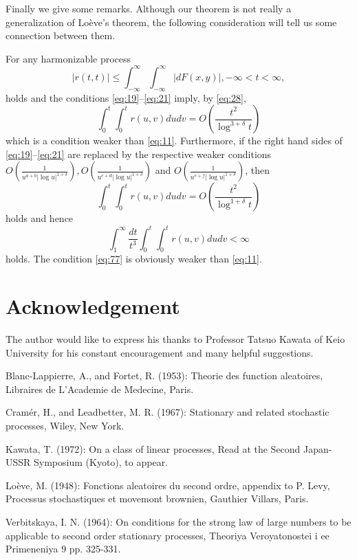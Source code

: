 \documentclass{article}
\begin{document}
Finally we give some remarks. Although our theorem is not really a generalization of Loève's theorem, the following consideration will tell us some connection between them.

For any harmonizable process
\begin{equation}\label{eq:74}
|r(t,t)| \leq \int_{-\infty}^{\infty} \int_{-\infty}^{\infty}|dF(x,y)|, -\infty<t<\infty,
\end{equation}
holds and the conditions \eqref{eq:19}--\eqref{eq:21} imply, by \eqref{eq:28},
\begin{equation}\label{eq:75}
\int_{0}^{t} \int_{0}^{t} r(u,v) dudv=O\left(\frac{t^{2}}{\log^{3+\delta} t}\right)
\end{equation}
which is a condition weaker than \eqref{eq:11}. Furthermore, if the right hand sides of \eqref{eq:19}--\eqref{eq:21} are replaced by the respective weaker conditions $O\left(\frac{1}{u^{a+b}|\log u|^{1+\delta}}\right), O\left(\frac{1}{u^{c+d}|\log u|^{1+\delta}}\right)$ and $O\left(\frac{1}{u^{e+f}|\log u|^{1+\delta}}\right)$, then
\begin{equation}\label{eq:76}
\int_{0}^{t} \int_{0}^{t} r(u,v) dudv=O\left(\frac{t^{2}}{\log^{1+\delta} t}\right)
\end{equation}
holds and hence
\begin{equation}\label{eq:77}
\int_{1}^{\infty} \frac{dt}{t^{3}} \int_{0}^{t} \int_{0}^{t} r(u,v) dudv<\infty
\end{equation}
holds. The condition \eqref{eq:77} is obviously weaker than \eqref{eq:11}.

\section*{Acknowledgement}

The author would like to express his thanks to Professor Tatsuo Kawata of Keio University for his constant encouragement and many helpful suggestions.

\begin{thebibliography}{99}

 Blanc-Lappierre, A., and Fortet, R. (1953): Theorie des function aleatoires, Libraires de L'Academie de Medecine, Paris.

 Cramér, H., and Leadbetter, M. R. (1967): Stationary and related stochastic processes, Wiley, New York.

 Kawata, T. (1972): On a class of linear processes, Read at the Second Japan-USSR Symposium (Kyoto), to appear.

 Loève, M. (1948): Fonctions aleatoires du second ordre, appendix to P. Levy, Processus stochastiques et movemont brownien, Gauthier Villars, Paris.

 Verbitskaya, I. N. (1964): On conditions for the strong law of large numbers to be applicable to second order stationary processes, Theoriya Veroyatonostei i ee Primeneniya $9$ pp. 325-331.

\end{thebibliography}
\end{document}

